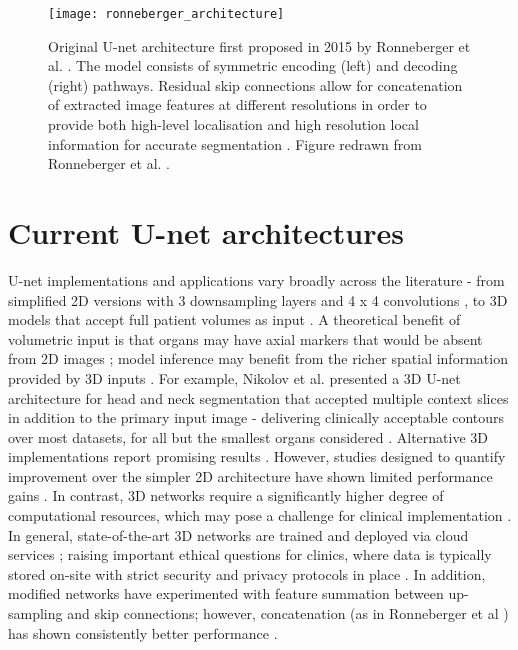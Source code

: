 \begin{figure}
	\begin{center}
		\texttt{[image: ronneberger\_architecture]}
		\caption{Original U-net architecture first proposed in 2015 by Ronneberger et al. \cite{Ronneberger_2015}. The model consists of symmetric encoding (left) and decoding (right) pathways. Residual skip connections allow for concatenation of extracted image features at different resolutions in order to provide both high-level localisation and high resolution local information for accurate segmentation \cite{Nemoto_2020}. Figure redrawn from Ronneberger et al. \cite{Ronneberger_2015}.}
		\label{fig:unet}
	\end{center}
\end{figure}



\section{Current U-net architectures}
U-net implementations and applications vary broadly across the literature - from simplified 2D versions with 3 downsampling layers and 4 x 4 convolutions \cite{Nemoto_2020}, to 3D models that accept full patient volumes as input \cite{Zhu_2018}. A theoretical benefit of volumetric input is that organs may have axial markers that would be absent from 2D images \cite{Hesamian2019}; model inference may benefit from the richer spatial information provided by 3D inputs \cite{Nemoto_2020}. For example, Nikolov et al. presented a 3D U-net architecture for head and neck segmentation that accepted multiple context slices in addition to the primary input image \cite{Nikolov_2018} - delivering clinically acceptable contours over most datasets, for all but the smallest organs considered \cite{Nikolov_2018}. Alternative 3D implementations report promising results \cite{ Nikolov_2018, Zhu_2018, _i_ek_2016}. However, studies designed to quantify improvement over the simpler 2D architecture have shown limited performance gains \cite{Nemoto_2020}. In contrast, 3D networks require a significantly higher degree of computational resources, which may pose a challenge for clinical implementation \cite{Nemoto_2020}. In general, state-of-the-art 3D networks are trained and deployed via cloud services \cite{Nemoto_2020}; raising important ethical questions for clinics, where data is typically stored on-site with strict security and privacy protocols in place \cite{Nemoto_2020, Lundervold2019}. In addition, modified networks have experimented with feature summation between up-sampling and skip connections; however, concatenation (as in Ronneberger et al \cite{Ronneberger_2015}) has shown consistently better performance \cite{Zhu_2018}.

